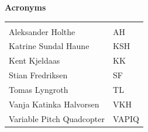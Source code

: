 \documentclass{report}
\begin{document}
\vspace*{3.0 cm}

\begin{center}
\textbf{\large Acronyms}\\
\vspace*{0.2cm}
\begin{tabular}{ll}
\rowcolor{cadetgrey}
    &   \\
Aleksander Holthe      & AH     
 \\\rowcolor{gainsboro}
Katrine Sundal Haune  & KSH \\
Kent Kjeldaas         & KK 
 \\\rowcolor{gainsboro}
Stian Fredriksen      & SF  \\
Tomas Lyngroth       & TL   
 \\\rowcolor{gainsboro}
Vanja Katinka Halvorsen     & VKH   \\
Variable Pitch Quadcopter   & VAPIQ
\end{tabular}                                                             
\end{center}
\clearpage




\newpage


\newpage


\newpage


\newpage

\makeatletter
{}
\setcounter{tocdepth}{-1}
\tableofcontents
\setcounter{tocdepth}{2}



%

%

%
%

%






\end{document}
